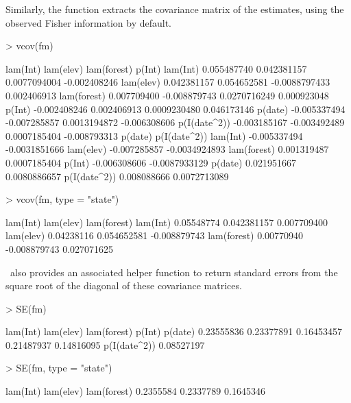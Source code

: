 \documentclass[article,shortnames]{jss}
\newcommand{\um}{\pkg{unmarked}}
\begin{document}
Similarly, the  function extracts the covariance matrix of
the estimates, using the observed Fisher information by default.

\begin{Schunk}
\begin{Sinput}
> vcov(fm)
\end{Sinput}
\begin{Soutput}
                 lam(Int)    lam(elev)   lam(forest)       p(Int)
lam(Int)      0.055487740  0.042381157  0.0077094004 -0.002408246
lam(elev)     0.042381157  0.054652581 -0.0088797433  0.002406913
lam(forest)   0.007709400 -0.008879743  0.0270716249  0.000923048
p(Int)       -0.002408246  0.002406913  0.0009230480  0.046173146
p(date)      -0.005337494 -0.007285857  0.0013194872 -0.006308606
p(I(date^2)) -0.003185167 -0.003492489  0.0007185404 -0.008793313
                  p(date)  p(I(date^2))
lam(Int)     -0.005337494 -0.0031851666
lam(elev)    -0.007285857 -0.0034924893
lam(forest)   0.001319487  0.0007185404
p(Int)       -0.006308606 -0.0087933129
p(date)       0.021951667  0.0080886657
p(I(date^2))  0.008088666  0.0072713089
\end{Soutput}
\begin{Sinput}
> vcov(fm, type = "state")
\end{Sinput}
\begin{Soutput}
              lam(Int)    lam(elev)  lam(forest)
lam(Int)    0.05548774  0.042381157  0.007709400
lam(elev)   0.04238116  0.054652581 -0.008879743
lam(forest) 0.00770940 -0.008879743  0.027071625
\end{Soutput}
\end{Schunk}

\um\ also provides an associated helper function  to return
standard errors from the square root of the diagonal of these
covariance matrices.

\begin{Schunk}
\begin{Sinput}
> SE(fm)
\end{Sinput}
\begin{Soutput}
    lam(Int)    lam(elev)  lam(forest)       p(Int)      p(date) 
  0.23555836   0.23377891   0.16453457   0.21487937   0.14816095 
p(I(date^2)) 
  0.08527197 
\end{Soutput}
\begin{Sinput}
> SE(fm, type = "state")
\end{Sinput}
\begin{Soutput}
   lam(Int)   lam(elev) lam(forest) 
  0.2355584   0.2337789   0.1645346 
\end{Soutput}
\end{Schunk}
\end{document}
